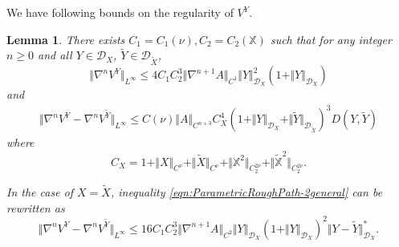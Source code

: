 \documentclass[11pt,a4paper,reqno]{amsart}%
\theoremstyle{plain}
\theoremstyle{remark}
\theoremstyle{plain}
\newtheorem{lemma}[theorem]{Lemma}
\numberwithin{equation}{section}
\begin{document}
 We have following bounds on the regularity of $V^Y$.
\begin{lemma}\label{lem:ParametricRoughPath}
 There exists $C_1=C_1(\nu),C_2=C_2(\mathbb{X})$ such that for
any integer $n\geq 0$ and all $Y\in \mathcal{D}_X$, $\tilde{Y}\in \mathcal{D}_{\tilde{X}}$,
\begin{equation}
\Vert \nabla^nV^Y\Vert_{L^{\infty}}\leq
4C_1C_2^3\Vert \nabla^{n+1}A\Vert_{C^1}\Vert Y\Vert_{\mathcal{D}_X}^2(1+\Vert Y\Vert_{\mathcal{D}_X})\label{eqn:ParametricRoughPath-1}
\end{equation}
and
\begin{multline}\label{eqn:ParametricRoughPath-2general}
\Vert \nabla^nV^Y-\nabla^nV^{\tilde{Y}}\Vert_{L^{\infty}}\leq
C(\nu)\Vert A\Vert_{C^{n+3}}C_X^4(1+\Vert Y\Vert_{\mathcal{D}_X}+\Vert \tilde{Y}\Vert_{\mathcal{D}_{\tilde{X}}})^3 D(Y,\tilde{Y})
\end{multline}
where
$$
C_X=1+\Vert X\Vert_{C^{\nu}}+\Vert \tilde{X}\Vert_{C^{\nu}}+\Vert \mathbb{X}^2\Vert_{C_2^{2\nu}}+\Vert \mathbb{\tilde{X}}^2\Vert_{C_2^{2\nu}}.
$$

In the case of $X=\tilde{X}$, inequality \eqref{eqn:ParametricRoughPath-2general} can be rewritten as
\begin{equation}
\Vert \nabla^nV^Y-\nabla^nV^{\tilde{Y}}\Vert_{L^{\infty}}\leq
16C_1C_2^3\Vert \nabla^{n+1}A\Vert_{C^2}\Vert Y\Vert_{\mathcal{D}_X}(1+\Vert Y\Vert_{\mathcal{D}_X})^2\Vert Y-\tilde{Y}\Vert_{\mathcal{D}_X}^*.
\label{eqn:ParametricRoughPath-2}
\end{equation}
\end{lemma}
\end{document}
